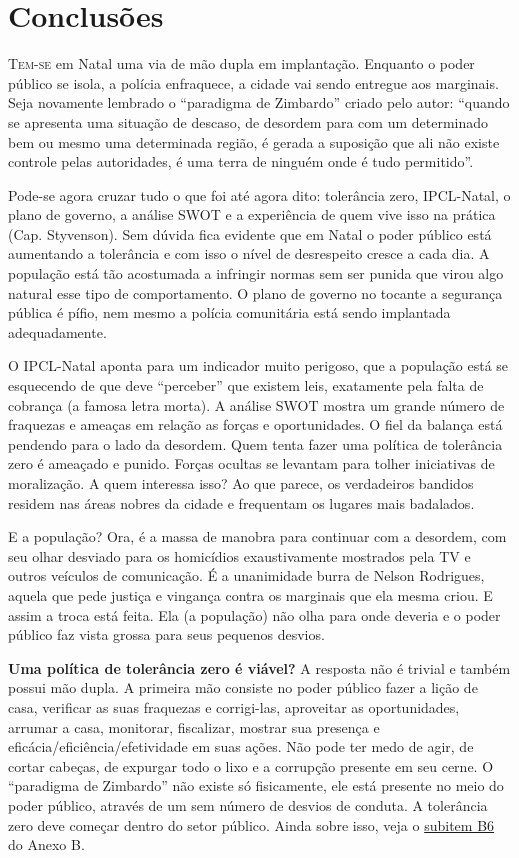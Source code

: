 \documentclass[
	12pt,				%
	openright,			%
	twoside,			%
	a4paper,			%
	chapter=TITLE,		%
	section=TITLE,		%
	subsection=TITLE,	%
	subsubsection=TITLE,%
	spanish,            %
	english,			%
	brazil				%
	]{abntex2}
\begin{document}
\chapter{Conclusões}
\lettrine[lines=2, lhang=0.33, loversize=0.25]{T}{em-se} em Natal uma via de mão dupla em implantação. Enquanto o poder público se isola, a polícia enfraquece, a cidade vai sendo entregue aos marginais. Seja novamente lembrado o “paradigma de Zimbardo” criado pelo autor: “quando se apresenta uma situação de descaso, de desordem para com um determinado bem ou mesmo uma determinada região, é gerada a suposição que ali não existe controle pelas autoridades, é uma terra de ninguém onde é tudo permitido”.
\par
Pode-se agora cruzar tudo o que foi até agora dito: tolerância zero, IPCL-Natal, o plano de governo, a análise SWOT e a experiência de quem vive isso na prática (Cap. Styvenson). Sem dúvida fica evidente que em Natal o poder público está aumentando a tolerância e com isso o nível de desrespeito cresce a cada dia. A população está tão acostumada a infringir normas sem ser punida que virou algo natural esse tipo de comportamento. O plano de governo no tocante a segurança pública é pífio, nem mesmo a polícia comunitária está sendo implantada adequadamente. 
\par
O IPCL-Natal aponta para um indicador muito perigoso, que a população está se esquecendo de que deve “perceber” que existem leis, exatamente pela falta de cobrança (a famosa letra morta). A análise SWOT mostra um grande número de fraquezas e ameaças em relação as forças e oportunidades. O fiel da balança está pendendo para o lado da desordem. Quem tenta fazer uma política de tolerância zero é ameaçado e punido. Forças ocultas se levantam para tolher iniciativas de moralização. A quem interessa isso? Ao que parece, os verdadeiros bandidos residem nas áreas nobres da cidade e frequentam os lugares mais badalados.
\par
E a população? Ora, é a massa de manobra para continuar com a desordem, com seu olhar desviado para os homicídios exaustivamente mostrados pela TV e outros veículos de comunicação. É a unanimidade burra de Nelson Rodrigues, aquela que pede justiça e vingança contra os marginais que ela mesma criou. E assim a troca está feita. Ela (a população) não olha para onde deveria e o poder público faz vista grossa para seus pequenos desvios.
\hypertarget{T0}{}
\par
\textbf{Uma política de tolerância zero é viável?} A resposta não é trivial e também possui mão dupla. A primeira mão consiste no poder público fazer a lição de casa, verificar as suas fraquezas e corrigi-las, aproveitar as oportunidades, arrumar a casa, monitorar, fiscalizar, mostrar sua presença e eficácia/eficiência/efetividade em suas ações. Não pode ter medo de agir, de cortar cabeças, de expurgar todo o lixo e a corrupção presente em seu cerne. O “paradigma de Zimbardo” não existe só fisicamente, ele está presente no meio do poder público, através de um sem número de desvios de conduta. A tolerância zero deve começar dentro do setor público. Ainda sobre isso, veja o \hyperlink{B6}{subitem B6} do Anexo B.
\end{document}
